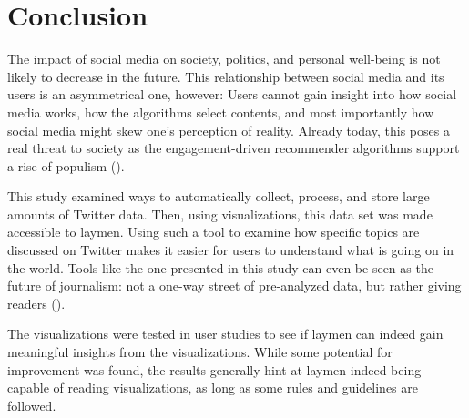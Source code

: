 \section{Conclusion}
The impact of social media on society, politics, and personal well-being is not likely to decrease in the future. This relationship between social media and its users is an asymmetrical one, however: Users cannot gain insight into how social media works, how the algorithms select contents, and most importantly  how social media might skew one's perception of reality. Already today, this poses a real threat to society as the engagement-driven recommender algorithms support a rise of populism (\cite{groshekHelpingPopulismWin2017}).

This study examined ways to automatically collect, process, and store large amounts of Twitter data. Then, using visualizations, this data set was made accessible to laymen. Using such a tool to examine how specific topics are discussed on Twitter makes it easier for users to understand what is going on in the world. Tools like the one presented in this study can even be seen as the future of journalism: not a one-way street of pre-analyzed data, but rather giving readers  (\cite{angwinMakingPrivacyPersonal2020}).

The visualizations were tested in user studies to see if laymen can indeed gain meaningful insights from the visualizations. While some potential for improvement was found, the results generally hint at laymen indeed being capable of reading visualizations, as long as some rules and guidelines are followed.





